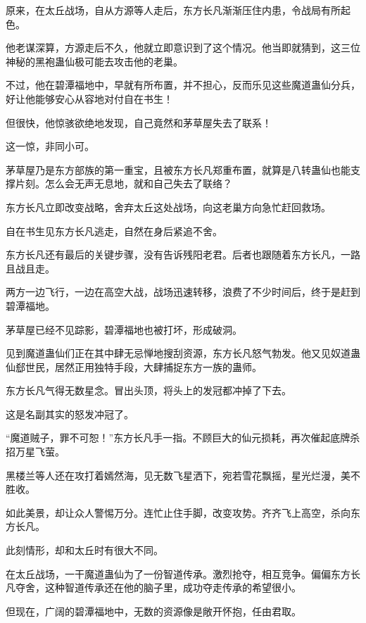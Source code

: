 
\begin{this_body}



原来，在太丘战场，自从方源等人走后，东方长凡渐渐压住内患，令战局有所起色。

他老谋深算，方源走后不久，他就立即意识到了这个情况。他当即就猜到，这三位神秘的黑袍蛊仙极可能去攻击他的老巢。

不过，他在碧潭福地中，早就有所布置，并不担心，反而乐见这些魔道蛊仙分兵，好让他能够安心从容地对付自在书生！

但很快，他惊骇欲绝地发现，自己竟然和茅草屋失去了联系！

这一惊，非同小可。

茅草屋乃是东方部族的第一重宝，且被东方长凡郑重布置，就算是八转蛊仙也能支撑片刻。怎么会无声无息地，就和自己失去了联络？

东方长凡立即改变战略，舍弃太丘这处战场，向这老巢方向急忙赶回救场。

自在书生见东方长凡逃走，自然在身后紧追不舍。

东方长凡还有最后的关键步骤，没有告诉残阳老君。后者也跟随着东方长凡，一路且战且走。

两方一边飞行，一边在高空大战，战场迅速转移，浪费了不少时间后，终于是赶到碧潭福地。

茅草屋已经不见踪影，碧潭福地也被打坏，形成破洞。

见到魔道蛊仙们正在其中肆无忌惮地搜刮资源，东方长凡怒气勃发。他又见奴道蛊仙郄世民，居然正用独特手段，大肆捕捉东方一族的蛊师。

东方长凡气得无数星念。冒出头顶，将头上的发冠都冲掉了下去。

这是名副其实的怒发冲冠了。

“魔道贼子，罪不可恕！”东方长凡手一指。不顾巨大的仙元损耗，再次催起底牌杀招万星飞萤。

黑楼兰等人还在攻打着嫣然海，见无数飞星洒下，宛若雪花飘摇，星光烂漫，美不胜收。

如此美景，却让众人警惕万分。连忙止住手脚，改变攻势。齐齐飞上高空，杀向东方长凡。

此刻情形，却和太丘时有很大不同。

在太丘战场，一干魔道蛊仙为了一份智道传承。激烈抢夺，相互竞争。偏偏东方长凡夺舍，这种智道传承还在他的脑子里，成功夺走传承的希望很小。

但现在，广阔的碧潭福地中，无数的资源像是敞开怀抱，任由君取。


\end{this_body}
